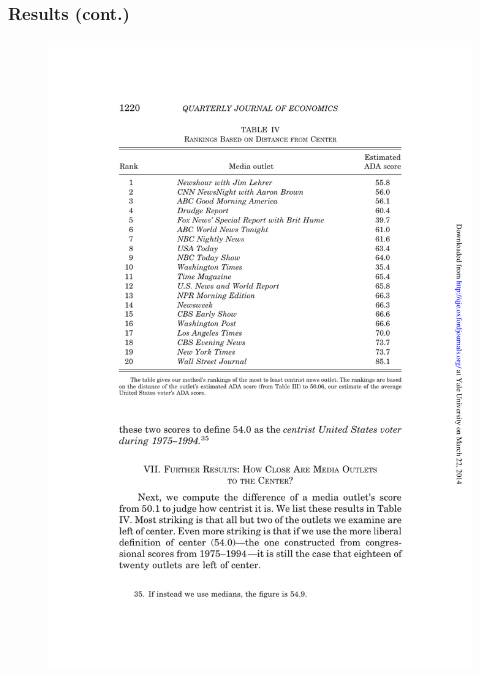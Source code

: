 \documentclass[english]{beamer}
\begin{document}
\begin{frame}
\frametitle{Results (cont.)}

\begin{figure}
\begin{center}
\includegraphics [width=0.9\vsize]{Images/groseclose_milyio_table2.pdf}
\end{center}
\end{figure}
\end{frame}
\end{document}
